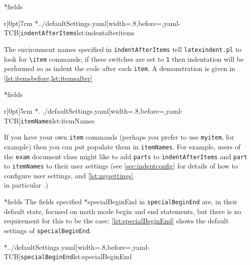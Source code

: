 *{fields}
	\begin{wrapfigure}[5]{r}[0pt]{7cm}
		\cmhlistingsfromfile[style=indentAfterItems]*{../defaultSettings.yaml}[width=.8\linewidth,before=\centering,yaml-TCB]{\texttt{indentAfterItems}}{lst:indentafteritems}
	\end{wrapfigure}
	The environment names specified in \texttt{indentAfterItems}  tell \texttt{latexindent.pl} to look for \lstinline!\item! commands; if these switches are set to \texttt{1} then indentation will be performed so as indent the code after each \texttt{item}.
	A demonstration is given in \cref{lst:itemsbefore,lst:itemsafter} 

	\begin{minipage}{.45\textwidth}
	\end{minipage} \hfill
	\begin{minipage}{.45\textwidth}
	\end{minipage} 

*{fields} \begin{wrapfigure}[5]{r}[0pt]{5cm} \cmhlistingsfromfile[style=itemNames]*{.
		./defaultSettings.yaml}[width=.8\linewidth,before=\centering,yaml-TCB]{\texttt{itemNames}}{lst:itemNames}%
	\end{wrapfigure}
	If you have your own \texttt{item} commands (perhaps you prefer to use \texttt{myitem}, for example) then you can put populate them in \texttt{itemNames}.
	For example, users of the \texttt{exam} document class might like to add \texttt{parts} to \texttt{indentAfterItems} and \texttt{part} to \texttt{itemNames} to their user settings (see \vref{sec:indentconfig} for details of how to configure user settings, and \vref{lst:mysettings} \\ in particular \label{page:examsettings}.)

*{fields}\label{yaml:specialBeginEnd}
	The fields specified%
	*{specialBeginEnd} in \texttt{specialBeginEnd} are, in their default state, focused on math mode begin and end statements, but there is no requirement for this to be the case; \cref{lst:specialBeginEnd} shows the default settings of \texttt{specialBeginEnd}.

	\cmhlistingsfromfile[style=specialBeginEnd]*{../defaultSettings.yaml}[width=.8\linewidth,before=\centering,yaml-TCB]{\texttt{specialBeginEnd}}{lst:specialBeginEnd}

